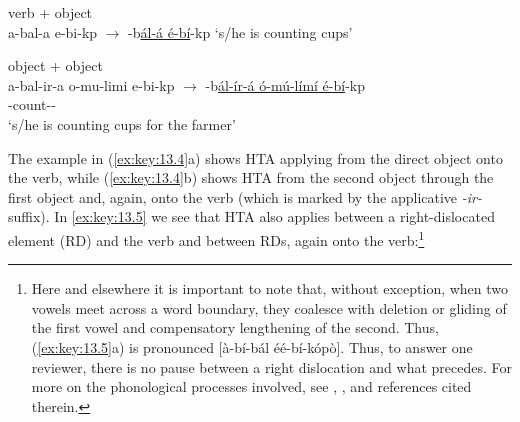 \documentclass[output=paper]{langsci/langscibook}
\begin{document}
\ea\label{ex:key:13.4}
    \ea verb + object\\
        a-bal-a e-bi-kp ${\rightarrow}$ -b\underline{ál-á é-bí}-kp ‘s/he is counting cups’
        \vspace{.75\baselineskip}
    \ex object + object\\
        a-bal-ir-a  o-mu-limi  e-bi-kp  ${\rightarrow}$
            -b\underline{ál-ír-á ó-mú-límí  é-bí}-kp\\
        {\footnotesize \Tsg{}-count-\Appl-\Fv{}}\\
        ‘s/he is counting cups for the farmer’
    \z
\z
The example in (\ref{ex:key:13.4}a) shows \gls{HTA} applying from the direct object
onto the verb, while (\ref{ex:key:13.4}b) shows \gls{HTA} from the second object
through the first object and, again, onto the verb (which is marked by the
applicative \emph{-ir-} suffix). In \eqref{ex:key:13.5} we see that \gls{HTA} also
applies between a right-dislocated element (\gls{RD}) and the verb
and between \glspl{RD}, again onto the verb:\footnote{Here and elsewhere it is
    important to note that, without exception, when two vowels meet across a
    word boundary, they coalesce with deletion or gliding of the first vowel
    and compensatory lengthening of the second. Thus, (\ref{ex:key:13.5}a) is
    pronounced [à-bí-bál éé-bí-kópò]. Thus, to answer one reviewer, there is no
    pause between a right dislocation and what precedes. For more on the
phonological processes involved, see \citet{Clements1986},
\citet{HymanKatamba1999}, and references cited therein.}
\end{document}
